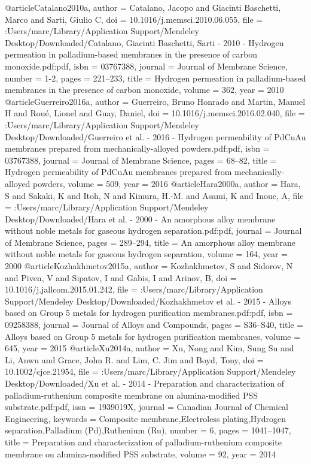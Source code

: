 @article{Catalano2010a,
author = {Catalano, Jacopo and {Giacinti Baschetti}, Marco and Sarti, Giulio C},
doi = {10.1016/j.memsci.2010.06.055},
file = {:Users/marc/Library/Application Support/Mendeley Desktop/Downloaded/Catalano, Giacinti Baschetti, Sarti - 2010 - Hydrogen permeation in palladium-based membranes in the presence of carbon monoxide.pdf:pdf},
isbn = {03767388},
journal = {Journal of Membrane Science},
number = {1-2},
pages = {221--233},
title = {{Hydrogen permeation in palladium-based membranes in the presence of carbon monoxide}},
volume = {362},
year = {2010}
}
@article{Guerreiro2016a,
author = {Guerreiro, Bruno Honrado and Martin, Manuel H and Rou{\'{e}}, Lionel and Guay, Daniel},
doi = {10.1016/j.memsci.2016.02.040},
file = {:Users/marc/Library/Application Support/Mendeley Desktop/Downloaded/Guerreiro et al. - 2016 - Hydrogen permeability of PdCuAu membranes prepared from mechanically-alloyed powders.pdf:pdf},
isbn = {03767388},
journal = {Journal of Membrane Science},
pages = {68--82},
title = {{Hydrogen permeability of PdCuAu membranes prepared from mechanically-alloyed powders}},
volume = {509},
year = {2016}
}
@article{Hara2000a,
author = {Hara, S and Sakaki, K and Itoh, N and Kimura, H.-M. and Asami, K and Inoue, A},
file = {:Users/marc/Library/Application Support/Mendeley Desktop/Downloaded/Hara et al. - 2000 - An amorphous alloy membrane without noble metals for gaseous hydrogen separation.pdf:pdf},
journal = {Journal of Membrane Science},
pages = {289--294},
title = {{An amorphous alloy membrane without noble metals for gaseous hydrogen separation}},
volume = {164},
year = {2000}
}
@article{Kozhakhmetov2015a,
author = {Kozhakhmetov, S and Sidorov, N and Piven, V and Sipatov, I and Gabis, I and Arinov, B},
doi = {10.1016/j.jallcom.2015.01.242},
file = {:Users/marc/Library/Application Support/Mendeley Desktop/Downloaded/Kozhakhmetov et al. - 2015 - Alloys based on Group 5 metals for hydrogen purification membranes.pdf:pdf},
isbn = {09258388},
journal = {Journal of Alloys and Compounds},
pages = {S36--S40},
title = {{Alloys based on Group 5 metals for hydrogen purification membranes}},
volume = {645},
year = {2015}
}
@article{Xu2014a,
author = {Xu, Nong and Kim, Sung Su and Li, Anwu and Grace, John R. and Lim, C. Jim and Boyd, Tony},
doi = {10.1002/cjce.21954},
file = {:Users/marc/Library/Application Support/Mendeley Desktop/Downloaded/Xu et al. - 2014 - Preparation and characterization of palladium-ruthenium composite membrane on alumina-modified PSS substrate.pdf:pdf},
issn = {1939019X},
journal = {Canadian Journal of Chemical Engineering},
keywords = {Composite membrane,Electroless plating,Hydrogen separation,Palladium (Pd),Ruthenium (Ru)},
number = {6},
pages = {1041--1047},
title = {{Preparation and characterization of palladium-ruthenium composite membrane on alumina-modified PSS substrate}},
volume = {92},
year = {2014}
}
